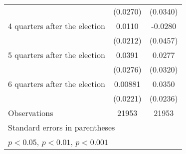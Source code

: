 \begin{table}[htbp]
\begin{tabular}{l*{2}{c}}
                    &    (0.0270)         &    (0.0340)         \\
[1em]
 4 quarters after the election&      0.0110         &     -0.0280         \\
                    &    (0.0212)         &    (0.0457)         \\
[1em]
 5 quarters after the election&      0.0391         &      0.0277         \\
                    &    (0.0276)         &    (0.0320)         \\
[1em]
 6 quarters after the election&     0.00881         &      0.0350         \\
                    &    (0.0221)         &    (0.0236)         \\
\hline
Observations        &       21953         &       21953         \\
\hline\hline
\multicolumn{3}{l}{\footnotesize Standard errors in parentheses}\\
\multicolumn{3}{l}{\footnotesize \sym{*} \(p<0.05\), \sym{**} \(p<0.01\), \sym{***} \(p<0.001\)}\\
\end{tabular}
\end{table}
